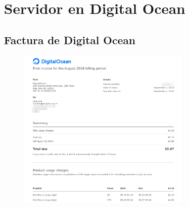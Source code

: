 \chapter{Servidor en Digital Ocean}
\label{appendix:server-do}

\section{Factura de Digital Ocean}

\begin{figure}[h]
    \centering
    \includegraphics[width=0.75\textwidth]{apendices/invoice-do.png}
\end{figure}
 
